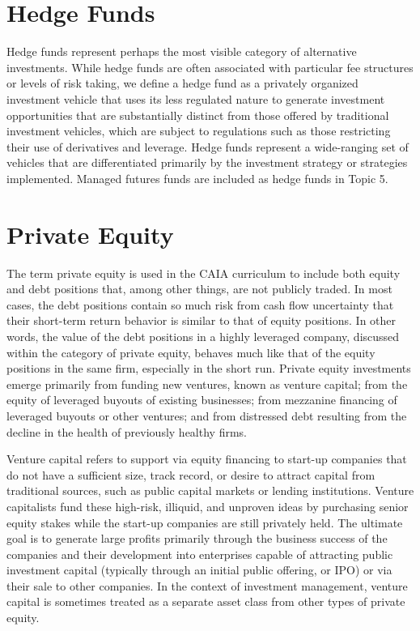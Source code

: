 \documentclass[11pt]{article}
\begin{document}
\section*{Hedge Funds}
Hedge funds represent perhaps the most visible category of alternative investments. While hedge funds are often associated with particular fee structures or levels of risk taking, we define a hedge fund as a privately organized investment vehicle that uses its less regulated nature to generate investment opportunities that are substantially distinct from those offered by traditional investment vehicles, which are subject to regulations such as those restricting their use of derivatives and leverage. Hedge funds represent a wide-ranging set of vehicles that are differentiated primarily by the investment strategy or strategies implemented. Managed futures funds are included as hedge funds in Topic 5.

\section*{Private Equity}
The term private equity is used in the CAIA curriculum to include both equity and debt positions that, among other things, are not publicly traded. In most cases, the debt positions contain so much risk from cash flow uncertainty that their short-term return behavior is similar to that of equity positions. In other words, the value of the debt positions in a highly leveraged company, discussed within the category of private equity, behaves much like that of the equity positions in the same firm, especially in the short run. Private equity investments emerge primarily from funding new ventures, known as venture capital; from the equity of leveraged buyouts of existing businesses; from mezzanine financing of leveraged buyouts or other ventures; and from distressed debt resulting from the decline in the health of previously healthy firms.

Venture capital refers to support via equity financing to start-up companies that do not have a sufficient size, track record, or desire to attract capital from traditional sources, such as public capital markets or lending institutions. Venture capitalists fund these high-risk, illiquid, and unproven ideas by purchasing senior equity stakes while the start-up companies are still privately held. The ultimate goal is to generate large profits primarily through the business success of the companies and their development into enterprises capable of attracting public investment capital (typically through an initial public offering, or IPO) or via their sale to other companies. In the context of investment management, venture capital is sometimes treated as a separate asset class from other types of private equity.
\end{document}
